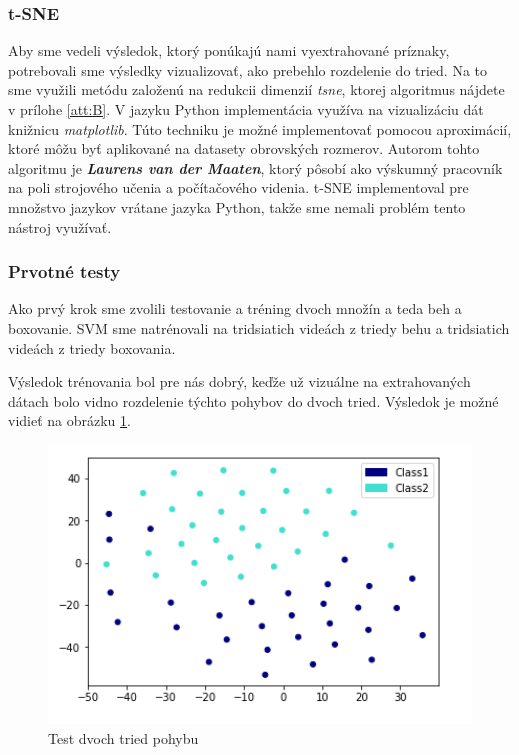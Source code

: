 \subsubsection{t-SNE}
Aby sme vedeli výsledok, ktorý ponúkajú nami vyextrahované príznaky, potrebovali sme výsledky vizualizovať, ako prebehlo rozdelenie do tried. Na to sme využili metódu založenú na redukcii dimenzií \textit{\acrfull{tsne}}, ktorej algoritmus nájdete v prílohe \ref{att:B}. V jazyku Python implementácia využíva na vizualizáciu dát knižnicu \textit{matplotlib}. Túto techniku je možné implementovať pomocou aproximácií, ktoré môžu byť aplikované na datasety obrovských rozmerov. Autorom tohto algoritmu je \textbf{\textit{Laurens van der Maaten}}, ktorý pôsobí ako výskumný pracovník na poli strojového učenia a počítačového videnia. t-SNE implementoval pre množstvo jazykov vrátane jazyka Python, takže sme nemali problém tento nástroj využívať. \cite{c18}



\subsubsection{Prvotné testy}
Ako prvý krok sme zvolili testovanie a tréning dvoch množín a teda beh a boxovanie. SVM sme natrénovali na tridsiatich videách z triedy behu a tridsiatich videách z triedy boxovania. 

Výsledok trénovania bol pre nás dobrý, keďže už vizuálne  na extrahovaných dátach bolo vidno rozdelenie týchto pohybov do dvoch tried. Výsledok je možné vidieť na obrázku \ref{Test2Class}. 

\begin{figure}[H]
  \centering
  \includegraphics[width=14cm]{img/test2classes.png}
  \caption{Test dvoch tried pohybu}
  \label{Test2Class}
\end{figure} 


